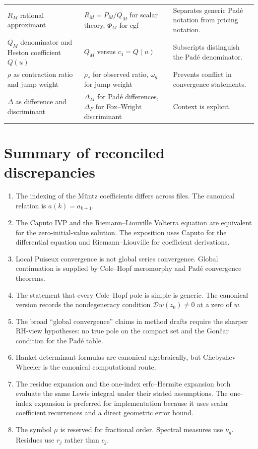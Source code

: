 \documentclass[11pt]{article}
\theoremstyle{definition}
\newcommand{\Dc}{\mathcal{D}}
\begin{document}
\begin{longtable}{p{}p{}p{}}
$R_M$ rational approximant & $R_M=P_M/Q_M$ for scalar theory, $\Phi_M$ for cgf & Separates generic Padé notation from pricing notation.\\
$Q_M$ denominator and Heston coefficient $Q(u)$ & $Q_M$ versus $c_1=Q(u)$ & Subscripts distinguish the Padé denominator.\\
$\rho$ as contraction ratio and jump weight & $\rho_*$ for observed ratio, $\omega_g$ for jump weight & Prevents conflict in convergence statements.\\
$\Delta$ as difference and discriminant & $\Delta_M$ for Padé differences, $\Delta_F$ for Fox--Wright discriminant & Context is explicit.\\
\bottomrule
\end{longtable}

\section{Summary of reconciled discrepancies}

\begin{enumerate}[label=(\arabic*)]
\item The indexing of the Müntz coefficients differs across files.
The canonical relation is $a(k)=a_{k+1}$.
\item The Caputo IVP and the Riemann--Liouville Volterra equation are equivalent for the zero-initial-value solution.
The exposition uses Caputo for the differential equation and Riemann--Liouville for coefficient derivations.
\item Local Puiseux convergence is not global series convergence.
Global continuation is supplied by Cole--Hopf meromorphy and Padé convergence theorems.
\item The statement that every Cole--Hopf pole is simple is generic.
The canonical version records the nondegeneracy condition $\Dc w(z_0)\ne0$ at a zero of $w$.
\item The broad ``global convergence'' claims in method drafts require the sharper RH-view hypotheses:
no true pole on the compact set and the Gončar condition for the Padé table.
\item Hankel determinant formulas are canonical algebraically,
but Chebyshev--Wheeler is the canonical computational route.
\item The residue expansion and the one-index erfc--Hermite expansion both evaluate the same Lewis integral under their stated assumptions.
The one-index expansion is preferred for implementation because it uses scalar coefficient recurrences and a direct geometric error bound.
\item The symbol $\mu$ is reserved for fractional order.
Spectral measures use $\nu_g$.
Residues use $r_j$ rather than $c_j$.
\end{enumerate}



\end{document}
